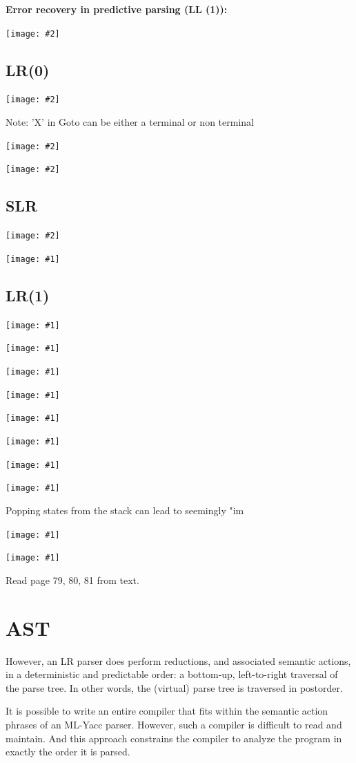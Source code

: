 \documentclass[8pt, a4paper, oneside, twocolumn]{extarticle}
\newcommand{\iph}[2]{
    \texttt{[image: \#2]}
}
\newcommand{\ph}[1]{
    \texttt{[image: \#1]}
}
\begin{document}
\textbf{Error recovery in predictive parsing (LL (1)):}

\iph{0.5}{erpp}

\subsection{LR(0)}

\iph{0.5}{lr0}

Note: 'X' in Goto can be either a terminal or non terminal
 
\iph{0.5}{lr01}

\iph{0.5}{lr02}

\subsection{SLR}

\iph{0.5}{slr}

\ph{slr2}

\subsection{LR(1)}

\ph{lr1}

\ph{lr2}

\ph{hier}

\ph{yaccpref}

\ph{yaccpref2}

\ph{yaccpref3}

\ph{yaccpref4}

\ph{yaccpref5}

Popping states from the stack can lead to seemingly "im

\ph{err}

\ph{gerr}

Read page 79, 80, 81 from text.

\section{AST}
However, an LR parser does perform reductions, and associated semantic
actions, in a deterministic and predictable order: a bottom-up, left-to-right
traversal of the parse tree. In other words, the (virtual) parse tree is traversed
in postorder.

It is possible to write an entire compiler that fits within the semantic action
phrases of an ML-Yacc parser. However, such a compiler is difficult to read
and maintain. And this approach constrains the compiler to analyze the 
program in exactly the order it is parsed.
\end{document}
